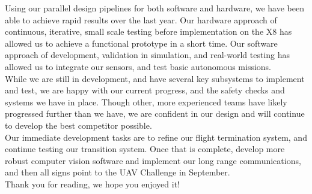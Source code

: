 Using our parallel design pipelines for both software and hardware, we have been able to achieve rapid results over the last year. Our hardware approach of continuous, iterative, small scale testing before implementation on the X8 has allowed us to achieve a functional prototype in a short time. Our software approach of development, validation in simulation, and real-world testing has allowed us to integrate our sensors, and test basic autonomous missions.\\

While we are still in development, and have several key subsystems to implement and test, we are happy with our current progress, and the safety checks and systems we have in place. Though other, more experienced teams have likely progressed further than we have, we are confident in our design and will continue to develop the best competitor possible.\\

Our immediate development tasks are to refine our flight termination system, and continue testing our transition system. Once that is complete, develop more robust computer vision software and implement our long range communications, and then all signs point to the UAV Challenge in September.\\

Thank you for reading, we hope you enjoyed it!